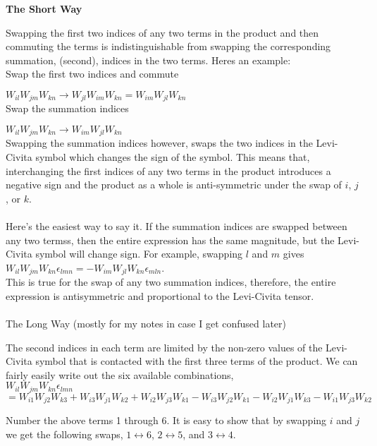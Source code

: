 \documentclass[prb,preprint]
{revtex4-1}
\begin{document}
\textbf{The Short Way}

Swapping the first two indices of any two terms in the product and then commuting the terms is indistinguishable from swapping the corresponding summation, (second), indices in the two terms.  Heres an example:\\

Swap the first two indices and commute

$W_{il}W_{jm}W_{kn} \rightarrow W_{jl}W_{im}W_{kn} = W_{im}W_{jl}W_{kn}$
\\

Swap the summation indices

$W_{il}W_{jm}W_{kn} \rightarrow W_{im}W_{jl}W_{kn}$
\\

Swapping the summation indices however, swaps the two indices in the Levi-Civita symbol which changes the sign of the symbol.  This means that, interchanging the first indices of any two terms in the product introduces a negative sign and the product as a whole is anti-symmetric under the swap of $i$, $j$, or $k$.
\\
\\
Here's the easiest way to say it.  If the summation indices are swapped between any two termss, then the entire expression has the same magnitude, but the Levi-Civita symbol will change sign.  For example, swapping $l$ and $m$ gives
\\
$W_{il}W_{jm}W_{kn} \epsilon_{lmn} = -W_{im}W_{jl}W_{kn} \epsilon_{mln}$.
\\
This is true for the swap of any two summation indices, therefore, the entire expression is antisymmetric and proportional to the Levi-Civita tensor.
\\
\\

The Long Way (mostly for my notes in case I get confused later)

The second indices in each term are limited by the non-zero values of the Levi-Civita symbol that is contacted with the first three terms of the product.  We can fairly easily write out the six available combinations,\\
$W_{il}W_{jm}W_{kn}\epsilon_{lmn}$\\
$= W_{i1}W_{j2}W_{k3} + W_{i3}W_{j1}W_{k2} + W_{i2}W_{j3}W_{k1} - W_{i3}W_{j2}W_{k1} - W_{i2}W_{j1}W_{k3} - W_{i1}W_{j3}W_{k2}$

Number the above terms 1 through 6.  It is easy to show that by swapping $i$ and $j$ we get the following swaps, $1\leftrightarrow 6$,  $2\leftrightarrow 5$, and $3\leftrightarrow 4$.  \\
\end{document}
